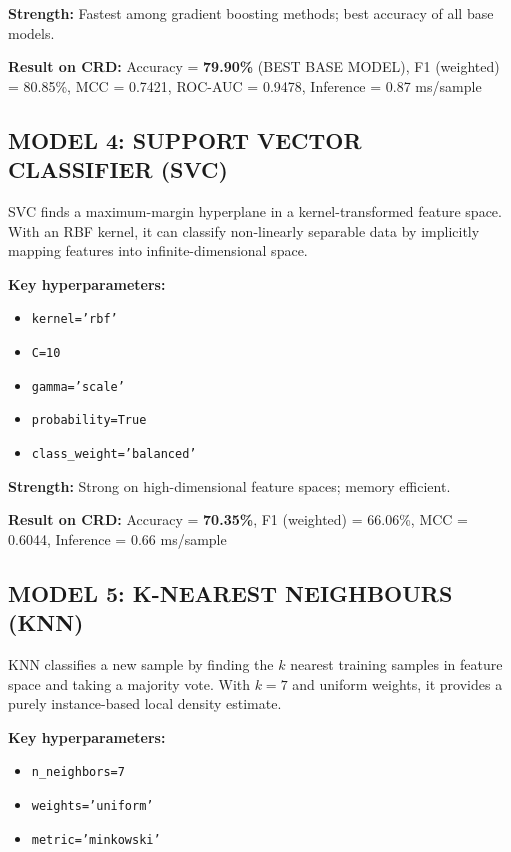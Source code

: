 \documentclass[12pt,a4paper,oneside]{report}
\begin{document}
\textbf{Strength:} Fastest among gradient boosting methods; best accuracy of all base models.

\textbf{Result on CRD:} Accuracy = \textbf{79.90\%} (BEST BASE MODEL), F1 (weighted) = 80.85\%, MCC = 0.7421, ROC-AUC = 0.9478, Inference = 0.87 ms/sample

\subsection{MODEL 4: SUPPORT VECTOR CLASSIFIER (SVC)}
SVC finds a maximum-margin hyperplane in a kernel-transformed feature space. With an RBF kernel, it can classify non-linearly separable data by implicitly mapping features into infinite-dimensional space.

\textbf{Key hyperparameters:}
\begin{singlespacing}
\begin{itemize}[leftmargin=2cm, label={}, itemsep=0pt]
  \item \texttt{kernel='rbf'}
  \item \texttt{C=10}
  \item \texttt{gamma='scale'}
  \item \texttt{probability=True}
  \item \texttt{class\_weight='balanced'}
\end{itemize}
\end{singlespacing}

\textbf{Strength:} Strong on high-dimensional feature spaces; memory efficient.

\textbf{Result on CRD:} Accuracy = \textbf{70.35\%}, F1 (weighted) = 66.06\%, MCC = 0.6044, Inference = 0.66 ms/sample

\subsection{MODEL 5: K-NEAREST NEIGHBOURS (KNN)}
KNN classifies a new sample by finding the $k$ nearest training samples in feature space and taking a majority vote. With $k=7$ and uniform weights, it provides a purely instance-based local density estimate.

\textbf{Key hyperparameters:}
\begin{singlespacing}
\begin{itemize}[leftmargin=2cm, label={}, itemsep=0pt]
  \item \texttt{n\_neighbors=7}
  \item \texttt{weights='uniform'}
  \item \texttt{metric='minkowski'}
\end{itemize}
\end{singlespacing}
\end{document}
